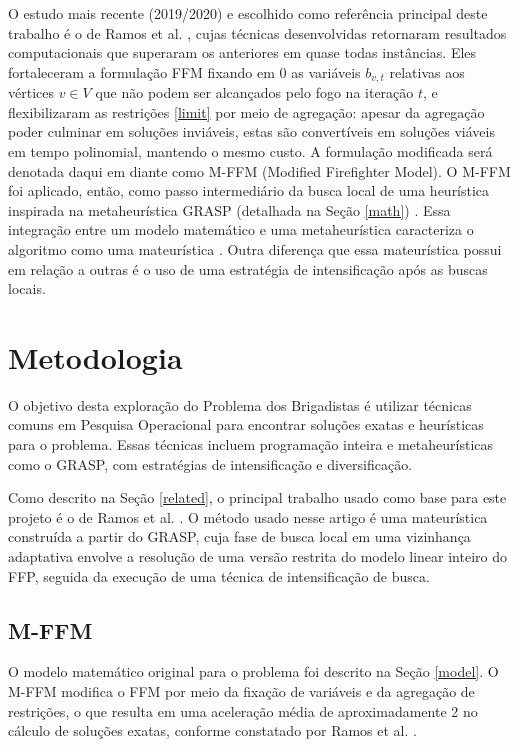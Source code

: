 \documentclass{MO824}
\begin{document}
    O estudo mais recente (2019/2020) e escolhido como referência principal deste trabalho é o de Ramos et al. \cite{natanael, nat_dissertation}, cujas técnicas desenvolvidas retornaram resultados computacionais que superaram os anteriores em quase todas instâncias. Eles fortaleceram a formulação FFM fixando em $0$ as variáveis $b_{v,t}$ relativas aos vértices $v \in V$ que não podem ser alcançados pelo fogo na iteração $t$, e flexibilizaram as restrições \eqref{limit} por meio de agregação: apesar da agregação poder culminar em soluções inviáveis, estas são convertíveis em soluções viáveis em tempo polinomial, mantendo o mesmo custo. A formulação modificada será denotada daqui em diante como M-FFM (Modified Firefighter Model). O M-FFM foi aplicado, então, como passo intermediário da busca local de uma heurística inspirada na metaheurística GRASP (detalhada na Seção \ref{math}) \cite{grasp}. Essa integração entre um modelo matemático e uma metaheurística caracteriza o algoritmo como uma mateurística \cite{matheuristic}. Outra diferença que essa mateurística possui em relação a outras é o uso de uma estratégia de intensificação após as buscas locais.
 
\section{Metodologia} \label{method}
    O objetivo desta exploração do Problema dos Brigadistas é utilizar técnicas comuns em Pesquisa Operacional para encontrar soluções exatas e heurísticas para o problema. Essas técnicas incluem programação inteira e metaheurísticas como o GRASP, com estratégias de intensificação e diversificação.
    
    Como descrito na Seção \ref{related}, o principal trabalho usado como base para este projeto é o de Ramos et al. \cite{natanael, nat_dissertation}. O método usado nesse artigo é uma mateurística construída a partir do GRASP, cuja fase de busca local em uma vizinhança adaptativa envolve a resolução de uma versão restrita do modelo linear inteiro do FFP, seguida da execução de uma técnica de intensificação de busca.
    
\subsection{M-FFM} \label{new_model}
    O modelo matemático original para o problema foi descrito na Seção \ref{model}. O M-FFM modifica o FFM por meio da fixação de variáveis e da agregação de restrições, o que resulta em uma aceleração média de aproximadamente 2 no cálculo de soluções exatas, conforme constatado por Ramos et al. \cite{natanael}.
    
\end{document}
